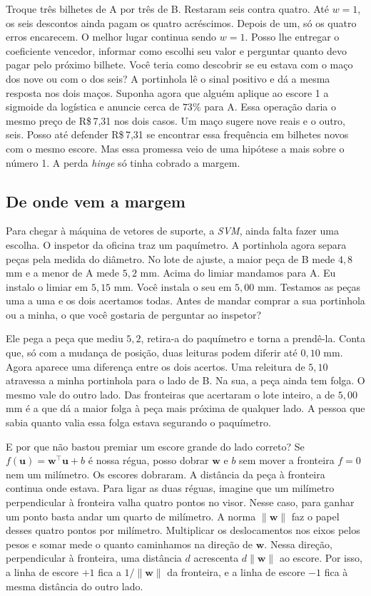 \documentclass[12pt,oneside]{article}
\newcommand{\secao}[1]{\Needspace{5.2\baselineskip}\subsection*{#1}}
\newcommand{\bookanchor}[1]{\phantomsection\label{#1}}
\begin{document}
Troque três bilhetes de A por três de B. Restaram seis contra quatro. Até $w=1$, os seis descontos ainda pagam os quatro acréscimos. Depois de um, só os quatro erros encarecem. O melhor lugar continua sendo $w=1$. Posso lhe entregar o coeficiente vencedor, informar como escolhi seu valor e perguntar quanto devo pagar pelo próximo bilhete. Você teria como descobrir se eu estava com o maço dos nove ou com o dos seis? A portinhola lê o sinal positivo e dá a mesma resposta nos dois maços. Suponha agora que alguém aplique ao escore 1 a sigmoide da logística e anuncie cerca de $73\%$ para A. Essa operação daria o mesmo preço de R\$\,7,31 nos dois casos. Um maço sugere nove reais e o outro, seis. Posso até defender R\$\,7,31 se encontrar essa frequência em bilhetes novos com o mesmo escore. Mas essa promessa veio de uma hipótese a mais sobre o número 1. A perda \emph{hinge} só tinha cobrado a margem.

\secao{De onde vem a margem}
Para\bookanchor{topic-06-5} chegar à máquina de vetores de suporte, a \emph{SVM}, ainda falta fazer uma escolha. O inspetor da oficina traz um paquímetro. A portinhola agora separa peças pela medida do diâmetro. No lote de ajuste, a maior peça de B mede $4{,}8$ mm e a menor de A mede $5{,}2$ mm. Acima do limiar mandamos para A. Eu instalo o limiar em $5{,}15$ mm. Você instala o seu em $5{,}00$ mm. Testamos as peças uma a uma e os dois acertamos todas. Antes de mandar comprar a sua portinhola ou a minha, o que você gostaria de perguntar ao inspetor?

Ele pega a peça que mediu $5{,}2$, retira-a do paquímetro e torna a prendê-la. Conta que, só com a mudança de posição, duas leituras podem diferir até $0{,}10$ mm. Agora aparece uma diferença entre os dois acertos. Uma releitura de $5{,}10$ atravessa a minha portinhola para o lado de B. Na sua, a peça ainda tem folga. O mesmo vale do outro lado. Das fronteiras que acertaram o lote inteiro, a de $5{,}00$ mm é a que dá a maior folga à peça mais próxima de qualquer lado. A pessoa que sabia quanto valia essa folga estava segurando o paquímetro.

E por que não bastou premiar um escore grande do lado correto? Se $f(\boldsymbol u)=\boldsymbol w^\top\boldsymbol u+b$ é nossa régua, posso dobrar $\boldsymbol w$ e $b$ sem mover a fronteira $f=0$ nem um milímetro. Os escores dobraram. A distância da peça à fronteira continua onde estava. Para ligar as duas réguas, imagine que um milímetro perpendicular à fronteira valha quatro pontos no visor. Nesse caso, para ganhar um ponto basta andar um quarto de milímetro. A norma $\lVert\boldsymbol w\rVert$ faz o papel desses quatro pontos por milímetro. Multiplicar os deslocamentos nos eixos pelos pesos e somar mede o quanto caminhamos na direção de $\boldsymbol w$. Nessa direção, perpendicular à fronteira, uma distância $d$ acrescenta $d\lVert\boldsymbol w\rVert$ ao escore. Por isso, a linha de escore $+1$ fica a $1/\lVert\boldsymbol w\rVert$ da fronteira, e a linha de escore $-1$ fica à mesma distância do outro lado.
\end{document}
